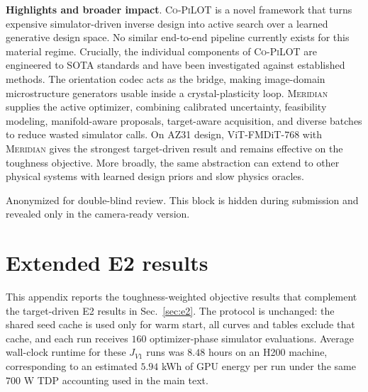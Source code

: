 \documentclass{article}
\newcommand{\Co}{\textsc{Co-PiLOT}}
\newcommand{\meridian}{\textsc{Meridian}}
\begin{document}
\textbf{Highlights and broader impact}. \Co{} is a novel framework that turns expensive simulator-driven inverse design into active search over a learned generative design space. No similar end-to-end pipeline currently exists for this material regime. Crucially, the individual components of \Co{} are engineered to SOTA standards and have been investigated against established methods. The orientation codec acts as the bridge, making image-domain microstructure generators usable inside a crystal-plasticity loop. \meridian{} supplies the active optimizer, combining calibrated uncertainty, feasibility modeling, manifold-aware proposals, target-aware acquisition, and diverse batches to reduce wasted simulator calls. On AZ31 design, ViT-FMDiT-$768$ with \meridian{} gives the strongest target-driven result and remains effective on the toughness objective. More broadly, the same abstraction can extend to other physical systems with learned design priors and slow physics oracles.



\begin{ack}
Anonymized for double-blind review. This block is hidden during submission and revealed only in the camera-ready version.
\end{ack}


{\small


}

\appendix

\section{Extended E2 results}
\label{app:extended-results}

This appendix reports the toughness-weighted objective results that complement the target-driven E2 results in Sec.~\ref{sec:e2}. The protocol is unchanged: the shared seed cache is used only for warm start, all curves and tables exclude that cache, and each run receives $160$ optimizer-phase simulator evaluations. Average wall-clock runtime for these $J_{V1}$ runs was $8.48$ hours on an H200 machine, corresponding to an estimated $5.94$ kWh of GPU energy per run under the same $700$ W TDP accounting used in the main text.
\end{document}

